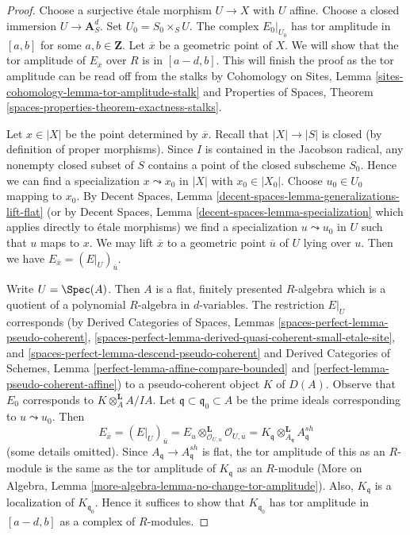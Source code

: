 \begin{proof}
Choose a surjective \'etale morphism $U \to X$ with $U$ affine.
Choose a closed immersion $U \to \mathbf{A}^d_S$.
Set $U_0 = S_0 \times_S U$.
The complex $E_0|_{U_0}$ has tor amplitude
in $[a, b]$ for some $a, b \in \mathbf{Z}$.
Let $\overline{x}$ be a geometric point of $X$.
We will show that the tor amplitude of
$E_{\overline{x}}$ over $R$ is in $[a - d, b]$.
This will finish the proof as the tor amplitude can be
read off from the stalks by
Cohomology on Sites, Lemma \ref{sites-cohomology-lemma-tor-amplitude-stalk}
and Properties of Spaces, Theorem
\ref{spaces-properties-theorem-exactness-stalks}.

\medskip\noindent
Let $x \in |X|$ be the point determined by $\overline{x}$.
Recall that $|X| \to |S|$ is closed (by definition of proper morphisms).
Since $I$ is contained in the Jacobson radical, any nonempty closed
subset of $S$ contains a point of the closed subscheme $S_0$.
Hence we can find a specialization $x \leadsto x_0$ in $|X|$
with $x_0 \in |X_0|$. Choose $u_0 \in U_0$ mapping to $x_0$.
By Decent Spaces, Lemma \ref{decent-spaces-lemma-generalizations-lift-flat}
(or by Decent Spaces, Lemma \ref{decent-spaces-lemma-specialization}
which applies directly to \'etale morphisms)
we find a specialization $u \leadsto u_0$ in $U$
such that $u$ maps to $x$. We may lift $\overline{x}$
to a geometric point $\overline{u}$ of $U$ lying over $u$.
Then we have $E_{\overline{x}} = (E|_U)_{\overline{u}}$.

\medskip\noindent
Write $U = \Spec(A)$. Then $A$ is a flat, finitely presented
$R$-algebra which is a quotient of a polynomial $R$-algebra in
$d$-variables. The restriction $E|_U$ corresponds
(by Derived Categories of Spaces, Lemmas
\ref{spaces-perfect-lemma-pseudo-coherent},
\ref{spaces-perfect-lemma-derived-quasi-coherent-small-etale-site}, and
\ref{spaces-perfect-lemma-descend-pseudo-coherent}
and
Derived Categories of Schemes, Lemma
\ref{perfect-lemma-affine-compare-bounded} and
\ref{perfect-lemma-pseudo-coherent-affine})
to a pseudo-coherent object $K$ of $D(A)$.
Observe that $E_0$ corresponds to $K \otimes_A^\mathbf{L} A/IA$.
Let $\mathfrak q \subset \mathfrak q_0 \subset A$ be the prime
ideals corresponding to $u \leadsto u_0$.
Then
$$
E_{\overline{x}} =
(E|_U)_{\overline{u}} =
E_u \otimes_{\mathcal{O}_{U, u}}^\mathbf{L} \mathcal{O}_{U, \overline{u}} =
K_{\mathfrak q} \otimes_{A_\mathfrak q}^\mathbf{L} A_{\mathfrak q}^{sh}
$$
(some details omitted). Since $A_\mathfrak q \to A_\mathfrak q^{sh}$
is flat, the tor amplitude of this as an $R$-module is the same as
the tor amplitude of $K_\mathfrak q$ as an $R$-module
(More on Algebra, Lemma \ref{more-algebra-lemma-no-change-tor-amplitude}).
Also, $K_{\mathfrak q}$ is a localization of $K_{\mathfrak q_0}$.
Hence it suffices to show that $K_{\mathfrak q_0}$ has tor amplitude in
$[a - d, b]$ as a complex of $R$-modules.


\end{proof}
